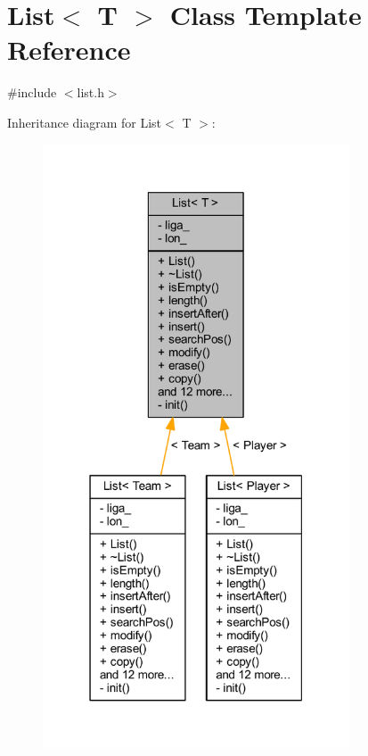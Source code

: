 \hypertarget{class_list}{}\section{List$<$ T $>$ Class Template Reference}
\label{class_list}


{\ttfamily \#include $<$list.\+h$>$}



Inheritance diagram for List$<$ T $>$\+:\nopagebreak
\begin{figure}[H]
\begin{center}
\leavevmode
\includegraphics[width=258pt]{d6/da6/class_list__inherit__graph}
\end{center}
\end{figure}


